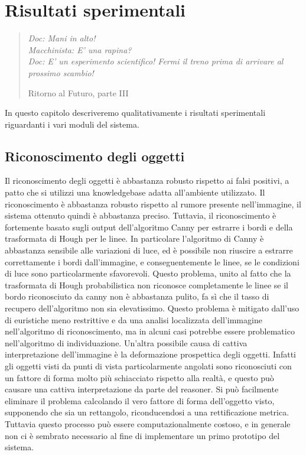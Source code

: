 \chapter{Risultati sperimentali}
\label{cap:risultati}
\thispagestyle{empty}

\begin{quotation}
{\footnotesize
\noindent\emph{Doc: Mani in alto! \\
Macchinista: E' una rapina? \\
Doc: E' un esperimento scientifico! Fermi il treno prima di arrivare al prossimo scambio!}
\begin{flushright}
Ritorno al Futuro, parte III
\end{flushright}
}
\end{quotation}
\vspace{0.5cm}

In questo capitolo descriveremo qualitativamente i risultati sperimentali riguardanti i vari moduli del sistema.

\section{Riconoscimento degli oggetti}
Il riconoscimento degli oggetti è abbastanza robusto rispetto ai falsi positivi, a patto che si utilizzi una knowledgebase adatta all'ambiente utilizzato. Il riconoscimento è abbastanza robusto rispetto al rumore presente nell'immagine, il sistema ottenuto quindi è abbastanza preciso. 
Tuttavia, il riconoscimento è fortemente basato sugli output dell'algoritmo Canny per estrarre i bordi e della trasformata di Hough per le linee. In particolare l'algoritmo di Canny è abbastanza sensibile alle variazioni di luce, ed è possibile non riuscire a estrarre correttamente i bordi dall'immagine, e conseguentemente le linee, se le condizioni di luce sono particolarmente sfavorevoli. Questo problema, unito al fatto che la trasformata di Hough probabilistica non riconosce completamente le linee se il bordo riconosciuto da canny non è abbastanza pulito, fa sì che il tasso di recupero dell'algoritmo non sia elevatissimo. Questo problema è mitigato dall'uso di euristiche meno restrittive e da una analisi localizzata dell'immagine nell'algoritmo di riconoscimento, ma in alcuni casi potrebbe essere problematico nell'algoritmo di individuazione. 
Un'altra possibile causa di cattiva interpretazione dell'immagine è la deformazione prospettica degli oggetti. Infatti gli oggetti visti da punti di vista particolarmente angolati sono riconosciuti con un fattore di forma molto più schiacciato rispetto alla realtà, e questo può causare una cattiva interpretazione da parte del reasoner. Si può facilmente eliminare il problema calcolando il vero fattore di forma dell'oggetto visto, supponendo che sia un rettangolo, riconducendosi a una rettificazione metrica. Tuttavia questo processo può essere computazionalmente costoso, e in generale non ci è sembrato necessario al fine di implementare un primo prototipo del sistema.


